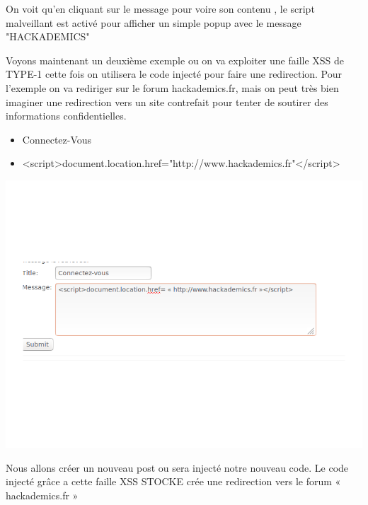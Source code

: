 \bigskip

\begin{flushleft}
On voit qu'en cliquant sur le message pour voire son contenu , le script malveillant est activé pour afficher un simple popup avec le message "HACKADEMICS"

\bigskip

Voyons maintenant un deuxième exemple ou on va exploiter une faille XSS de TYPE-1 cette fois on utilisera le code injecté pour faire une redirection. Pour l'exemple on va rediriger sur le forum  hackademics.fr, mais on peut très bien imaginer une redirection vers un site contrefait pour tenter de soutirer des informations confidentielles.
\end{flushleft}

\bigskip

\begin{itemize}
\item Connectez-Vous
\item <script>document.location.href="http://www.hackademics.fr"</script>
\end{itemize}

\begin{center}
\includegraphics[scale=0.3]{Web/assets/xsst100.png}
\end{center}

\bigskip

\begin{flushleft}
Nous allons créer un nouveau post ou sera injecté notre nouveau code. Le code injecté grâce a cette faille XSS STOCKE crée une redirection vers le forum « hackademics.fr »
\end{flushleft}


